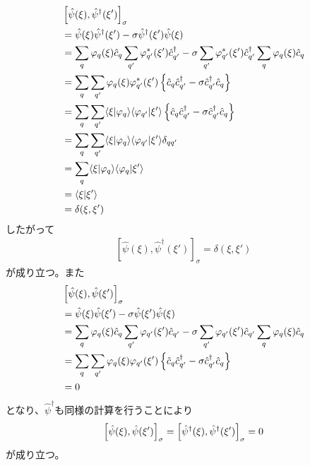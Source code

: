 \documentclass[dvipdfmx, 11pt, a4paper]{jsarticle}
\numberwithin{equation}{section}
\theoremstyle{definition}
\begin{document}
\begin{derivationBox}
\begin{align}
            &\left[ \hat{\psi}(\xi),\hat{\psi}^{\dagger}(\xi') \right]_\sigma \notag \\
            &= \hat{\psi}(\xi)\hat{\psi}^\dagger (\xi') - \sigma \hat{\psi}^\dagger(\xi')\hat{\psi}(\xi) \notag \\
            &= \sum_q \varphi_q(\xi) \hat{c}_q  \sum_{q'} \varphi^*_{q'}(\xi') \hat{c}^\dagger_{q'} - \sigma \sum_{q'} \varphi^*_{q'}(\xi') \hat{c}^\dagger_{q'}\sum_q \varphi_q(\xi) \hat{c}_q  \notag \\
            &= \sum_q \sum_{q'} \varphi_q(\xi) \varphi^*_{q'}(\xi') \left\{ \hat{c}_q  \hat{c}^\dagger_{q'} - \sigma \hat{c}^\dagger_{q'} \hat{c}_q \right\} \notag \\
            &= \sum_q \sum_{q'} \langle \xi|\varphi_q \rangle  \langle \varphi_{q'}|\xi'\rangle \left\{ \hat{c}_q  \hat{c}^\dagger_{q'} - \sigma \hat{c}^\dagger_{q'} \hat{c}_q \right\} \notag \\
            &= \sum_q \sum_{q'} \langle \xi|\varphi_q \rangle  \langle \varphi_{q'}|\xi'\rangle \delta_{qq'} \notag \\
            &= \sum_q \langle \xi|\varphi_q \rangle  \langle \varphi_{q}|\xi'\rangle \notag \\
            &= \langle \xi|\xi' \rangle \notag \\
            &= \delta(\xi,\xi') \notag 
        \end{align}
        したがって
        \begin{align}
            \left[ \hat{\psi}(\xi),\hat{\psi}^{\dagger}(\xi') \right]_\sigma = \delta (\xi,\xi')
        \end{align}
        が成り立つ。また
        \begin{align}
            &\left[ \hat{\psi}(\xi),\hat{\psi}(\xi') \right]_\sigma \notag \\
            &= \hat{\psi}(\xi)\hat{\psi} (\xi') - \sigma \hat{\psi}(\xi')\hat{\psi}(\xi) \notag \\
            &= \sum_q \varphi_q(\xi) \hat{c}_q  \sum_{q'} \varphi_{q'}(\xi') \hat{c}_{q'} - \sigma \sum_{q'} \varphi_{q'}(\xi') \hat{c}_{q'}\sum_q \varphi_q(\xi) \hat{c}_q  \notag \\
            &= \sum_q \sum_{q'} \varphi_q(\xi) \varphi_{q'}(\xi') \left\{ \hat{c}_q  \hat{c}^\dagger_{q'} - \sigma \hat{c}^\dagger_{q'} \hat{c}_q \right\} \notag \\
            &= 0 \notag 
        \end{align}
        となり、$\hat{\psi}^\dagger$も同様の計算を行うことにより
        \begin{align}
            \left[ \hat{\psi}(\xi),\hat{\psi}(\xi') \right]_\sigma = \left[ \hat{\psi}^\dagger (\xi),\hat{\psi}^{\dagger}(\xi') \right]_\sigma = 0 \notag 
        \end{align}
        が成り立つ。
    \end{derivationBox}
\end{document}
